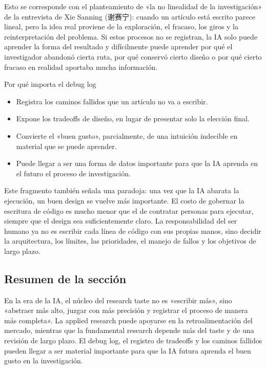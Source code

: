 Esto se corresponde con el planteamiento de «la no linealidad de la investigación» de la entrevista de Xie Sanning (谢赛宁): cuando un artículo está escrito parece lineal, pero la idea real proviene de la exploración, el fracaso, los giros y la reinterpretación del problema. Si estos procesos no se registran, la IA solo puede aprender la forma del resultado y difícilmente puede aprender por qué el investigador abandonó cierta ruta, por qué conservó cierto diseño o por qué cierto fracaso en realidad aportaba mucha información.

\begin{knowledgebox}{Por qué importa el debug log}
\begin{itemize}
  \item Registra los caminos fallidos que un artículo no va a escribir.
  \item Expone los tradeoffs de diseño, en lugar de presentar solo la elección final.
  \item Convierte el «buen gusto», parcialmente, de una intuición indecible en material que se puede aprender.
  \item Puede llegar a ser una forma de datos importante para que la IA aprenda en el futuro el proceso de investigación.
\end{itemize}
\end{knowledgebox}

Este fragmento también señala una paradoja: una vez que la IA abarata la ejecución, un buen design se vuelve más importante. El costo de gobernar la escritura de código es mucho menor que el de contratar personas para ejecutar, siempre que el design sea suficientemente claro. La responsabilidad del ser humano ya no es escribir cada línea de código con sus propias manos, sino decidir la arquitectura, los límites, las prioridades, el manejo de fallos y los objetivos de largo plazo.

\subsection{Resumen de la sección}

En la era de la IA, el núcleo del research taste no es «escribir más», sino «abstraer más alto, juzgar con más precisión y registrar el proceso de manera más completa». La applied research puede apoyarse en la retroalimentación del mercado, mientras que la fundamental research depende más del taste y de una revisión de largo plazo. El debug log, el registro de tradeoffs y los caminos fallidos pueden llegar a ser material importante para que la IA futura aprenda el buen gusto en la investigación.
